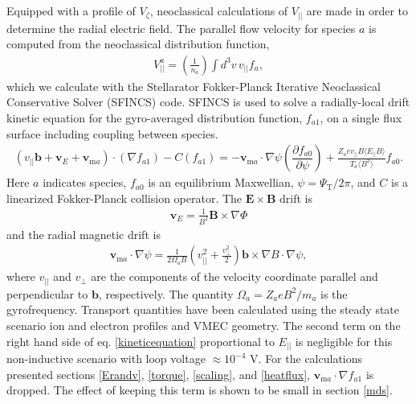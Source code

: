 \documentclass[aip, pop, preprint]{revtex4-1}
\numberwithin{figure}{section}
\numberwithin{equation}{section}
\newcommand{\partder}[2]{\dfrac{\partial  #1}{\partial  #2}} %
\begin{document}
Equipped with a profile of $V_{\zeta}$, neoclassical calculations of $V_{||}$ are made in order to determine the radial electric field. The parallel flow velocity for species $a$ is computed from the neoclassical distribution function,
\begin{gather}
V^a_{||} = \left(\frac{1}{n_a}\right) \int d^3 v \, v_{||} f_a,
\label{eq:parallelflow}
\end{gather}
which we calculate with the Stellarator Fokker-Planck Iterative Neoclassical Conservative Solver (SFINCS) \cite{Landreman2014} code.
SFINCS is used to solve a radially-local drift kinetic equation for the gyro-averaged distribution function, $f_{a1}$, on a single flux surface including coupling between species. 
\begin{gather}
( v_{||} \bm{b} + \bm{v}_E + \bm{v}_{\text{m}a}) \cdot (\nabla f_{a1})  - C(f_{a1}) = - \bm{v}_{\text{m}a} \cdot \nabla \psi \left( \partder{f_{a0}}{\psi} \right) + \frac{Z_a e v_{||} B \langle E_{||} B \rangle}{T_a \langle B^2 \rangle } f_{a0}.
\label{kineticequation}
\end{gather} 
\hspace{-1mm}
Here $a$ indicates species, $f_{a0}$ is an equilibrium Maxwellian, $\psi = \Psi_{\text{T}}/2\pi$, and $C$ is a linearized Fokker-Planck collision operator. The $\bm{E} \times \bm{B}$ drift is 
\begin{gather}
\bm{v}_E = \frac{1}{B^2} \bm{B} \times \nabla \Phi
\end{gather} 
and the radial magnetic drift is
\begin{gather}
\bm{v}_{\text{m}a} \cdot \nabla \psi = \frac{1}{2\Omega_a B} \left(v_{||}^2 + \frac{v_{\perp}^2}{2} \right) \bm{b} \times \nabla B \cdot \nabla \psi,
\label{magneticdrift}
\end{gather} 
where $v_{||}$ and $v_{\perp}$ are the components of the velocity coordinate parallel and perpendicular to $\bm{b}$, respectively. The quantity $\Omega_a = Z_aeB^2/m_a$ is the gyrofrequency. Transport quantities have been calculated using the steady state scenario ion and electron profiles and VMEC geometry. The second term on the right hand side of eq. \ref{kineticequation} proportional to $E_{||}$ is negligible for this non-inductive scenario with loop voltage $ \approx 10^{-4}$ V. For the calculations presented sections \ref{Erandv}, \ref{torque}, \ref{scaling}, and \ref{heatflux}, $\bm{v}_{\text{m}a} \cdot \nabla f_{a1}$ is dropped. The effect of keeping this term is shown to be small in section \ref{mds}.
\end{document}

